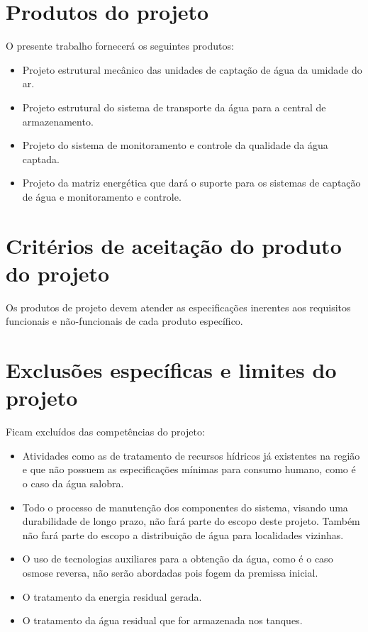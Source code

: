 \section*{Produtos do projeto}

  O presente trabalho fornecerá os seguintes produtos:
  
  \begin{itemize}
    \item Projeto estrutural mecânico das unidades de captação de água da umidade do ar.
    \item Projeto estrutural do sistema de transporte da água para a central de armazenamento.
    \item Projeto do sistema de monitoramento e controle da qualidade da água captada.
    \item Projeto da matriz energética que dará o suporte para os sistemas de captação de água e monitoramento e controle.
  \end{itemize}

\section*{Critérios de aceitação do produto do projeto}

  Os produtos de projeto devem atender as especificações inerentes aos requisitos funcionais
  e não-funcionais de cada produto específico.
  
\section*{Exclusões específicas e limites do projeto}

  Ficam excluídos das competências do projeto:
  
  \begin{itemize}
   \item Atividades como as de tratamento de recursos hídricos já existentes na região e que não possuem
      as especificações mínimas para consumo humano, como é o caso da água salobra.
   
   \item Todo o processo de manutenção dos componentes do sistema, visando uma durabilidade de longo prazo, não fará parte 
      do escopo deste projeto. Também não fará parte do escopo a distribuição de água para localidades vizinhas.
      
   \item O uso de tecnologias auxiliares para a obtenção da água, como é o caso osmose reversa, não serão abordadas
      pois fogem da premissa inicial.
   
   \item O tratamento da energia residual gerada.
   
   \item O tratamento da água residual que for armazenada nos tanques.
   
  \end{itemize}

